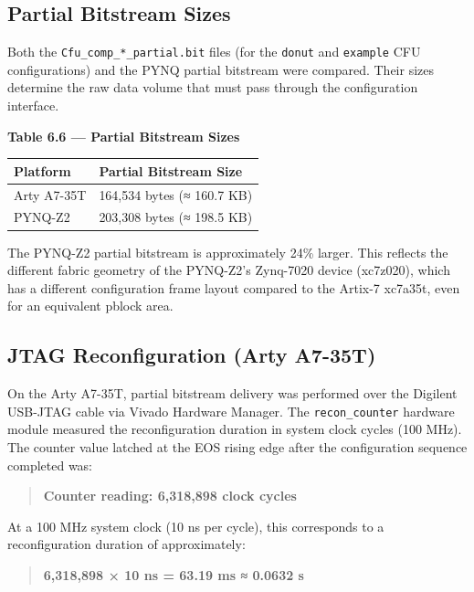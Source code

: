 \subsection{Partial Bitstream Sizes}

Both the \texttt{Cfu\_comp\_*\_partial.bit} files (for the \texttt{donut} and \texttt{example} CFU configurations) and the PYNQ partial bitstream were compared. Their sizes determine the raw data volume that must pass through the configuration interface.

\textbf{Table 6.6 — Partial Bitstream Sizes}

\begin{table}[htbp]
\centering
\begin{tabularx}{\textwidth}{X X}
\toprule
Platform & Partial Bitstream Size \\
\midrule
Arty A7-35T & 164,534 bytes (≈ 160.7 KB) \\
PYNQ-Z2 & 203,308 bytes (≈ 198.5 KB) \\
\bottomrule
\end{tabularx}
\end{table}

The PYNQ-Z2 partial bitstream is approximately 24\% larger. This reflects the different fabric geometry of the PYNQ-Z2's Zynq-7020 device (xc7z020), which has a different configuration frame layout compared to the Artix-7 xc7a35t, even for an equivalent pblock area.

\subsection{JTAG Reconfiguration (Arty A7-35T)}

On the Arty A7-35T, partial bitstream delivery was performed over the Digilent USB-JTAG cable via Vivado Hardware Manager. The \texttt{recon\_counter} hardware module measured the reconfiguration duration in system clock cycles (100 MHz). The counter value latched at the EOS rising edge after the configuration sequence completed was:

\begin{quote}
\textbf{Counter reading: 6,318,898 clock cycles}
\end{quote}

At a 100 MHz system clock (10 ns per cycle), this corresponds to a reconfiguration duration of approximately:

\begin{quote}
\textbf{6,318,898 × 10 ns = 63.19 ms ≈ 0.0632 s}
\end{quote}

